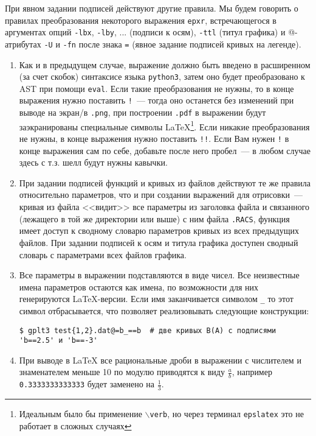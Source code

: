 \documentclass[12pt]{article}
\def\python{{\tt python3}}
\def\png{{\tt .png}}
\def\pdf{{\tt .pdf}}
\begin{document}
При явном задании подписей действуют другие правила.
Мы будем говорить о правилах преобразования некоторого выражения \verb'epxr', встречающегося в аргументах опций
\verb'-lbx', \verb'-lby', ... (подписи к осям),  \verb'-ttl' (титул графика) и @-атрибутах \verb'-U' и \verb'-fn' после знака \verb'='
(явное задание подписей кривых на легенде).   
\begin{enumerate}
\item Как и в предыдущем случае, выражение должно быть введено в расширенном (за счет скобок) синтаксисе языка \python,
  затем оно будет преобразовано к AST при помощи \verb'eval'. Если такие преобразования не нужны, то в конце выражения
  нужно поставить \verb'!'~--- тогда оно останется без изменений при выводе на экран/в \png, при построении \pdf{} в выражении
  будут заэкранированы специальные символы \LaTeX{}\footnote{Идеальным было бы применение {\tt $\backslash$verb}, но через терминал {\tt epslatex}
    это не работает в сложных случаях}.  
  Если никакие преобразования не нужны, в конце выражения нужно поставить \verb'!!'. Если Вам нужен \verb'!' в конце выражения сам по себе,
  добавьте после него пробел~--- в любом случае здесь с т.з. шелл будут нужны кавычки.
\item При задании подписей функций и кривых из файлов действуют те же правила относительно параметров, что и при создании выражений для отрисовки~---
  кривая из файла <<видит>> все параметры из заголовка файла и связанного (лежащего в той же директории или выше) с ним файла \verb'.RACS',
  функция имеет доступ к сводному словарю параметров кривых из всех предыдущих файлов. При задании подписей к осям и титула графика
  доступен сводный словарь с параметрами всех файлов графика.
\item Все параметры в выражении подставляются в виде чисел.  Все неизвестные имена параметров остаются как имена, по возможности для них генерируются \LaTeX{}-версии.
  Если имя заканчивается символом \verb'_' то этот символ отбрасывается, что позволяет реализовывать следующие конструкции:
\begin{verbatim}
$ gplt3 test{1,2}.dat@=b_==b  # две кривых B(A) с подписями 'b==2.5' и 'b==-3'
\end{verbatim}
\item   При выводе в \LaTeX{} все рациональные дроби в выражении
  с числителем и знаменателем меньше 10 по модулю приводятся к виду $\frac ab$, например \verb'0.3333333333333' будет заменено на $\frac13$.
\end{enumerate}
\end{document}
